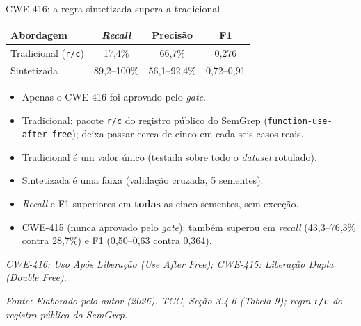 \documentclass[
    aspectratio=169,
    12pt,
    brazil
]{beamer}
\newcommand{\fonte}[1]{{\tiny\itshape Fonte: #1\par}}
\begin{document}
\begin{frame}{CWE-416: a regra sintetizada supera a tradicional}
  \begin{table}
  \small
  \begin{tabular}{lccc}
  \toprule
  \textbf{Abordagem} & \textbf{\textit{Recall}} & \textbf{Precisão} & \textbf{F1} \\
  \midrule
  Tradicional (\texttt{r/c}) & 17,4\% & 66,7\% & 0,276 \\
  Sintetizada & 89,2--100\% & 56,1--92,4\% & 0,72--0,91 \\
  \bottomrule
  \end{tabular}
  \end{table}
  \begin{itemize}
    \footnotesize
    \item Apenas o CWE-416 foi aprovado pelo \textit{gate}.
    \item Tradicional: pacote \texttt{r/c} do registro público do SemGrep (\texttt{function-use-after-free}); deixa passar cerca de cinco em cada seis casos reais.
    \item Tradicional é um valor único (testada sobre todo o \textit{dataset} rotulado).
    \item Sintetizada é uma faixa (validação cruzada, 5 sementes).
    \item \textit{Recall} e F1 superiores em \textbf{todas} as cinco sementes, sem exceção.
    \item CWE-415 (nunca aprovado pelo \textit{gate}): também superou em \textit{recall} (43,3--76,3\% contra 28,7\%) e F1 (0,50--0,63 contra 0,364).
  \end{itemize}
  \vspace{0.1cm}
  \vfill
  {\tiny\itshape CWE-416: Uso Após Liberação (\textit{Use After Free}); CWE-415: Liberação Dupla (\textit{Double Free}).\par}
  \fonte{Elaborado pelo autor (2026). TCC, Seção 3.4.6 (Tabela 9); regra \texttt{r/c} do registro público do SemGrep.}
\end{frame}
\end{document}
